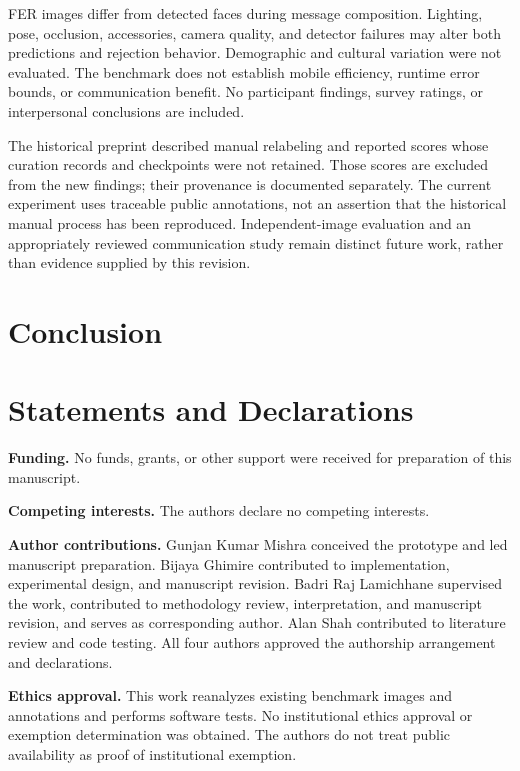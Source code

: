 \documentclass[pdflatex,sn-mathphys-num]{sn-jnl}
\begin{document}
FER images differ from detected faces during message composition. Lighting, pose, occlusion, accessories, camera quality, and detector failures may alter both predictions and rejection behavior. Demographic and cultural variation were not evaluated. The benchmark does not establish mobile efficiency, runtime error bounds, or communication benefit. No participant findings, survey ratings, or interpersonal conclusions are included.

The historical preprint described manual relabeling and reported scores whose curation records and checkpoints were not retained. Those scores are excluded from the new findings; their provenance is documented separately. The current experiment uses traceable public annotations, not an assertion that the historical manual process has been reproduced. Independent-image evaluation and an appropriately reviewed communication study remain distinct future work, rather than evidence supplied by this revision.

\section{Conclusion}



\backmatter
\section*{Statements and Declarations}
\noindent\textbf{Funding.} No funds, grants, or other support were received for preparation of this manuscript.

\noindent\textbf{Competing interests.} The authors declare no competing interests.

\noindent\textbf{Author contributions.} Gunjan Kumar Mishra conceived the prototype and led manuscript preparation. Bijaya Ghimire contributed to implementation, experimental design, and manuscript revision. Badri Raj Lamichhane supervised the work, contributed to methodology review, interpretation, and manuscript revision, and serves as corresponding author. Alan Shah contributed to literature review and code testing. All four authors approved the authorship arrangement and declarations.

\noindent\textbf{Ethics approval.} This work reanalyzes existing benchmark images and annotations and performs software tests. No institutional ethics approval or exemption determination was obtained. The authors do not treat public availability as proof of institutional exemption.
\end{document}
